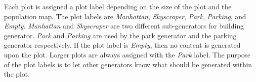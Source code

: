 Each plot is assigned a plot label depending on the size of the plot and the population map.
The plot labels are \textit{Manhattan}, \textit{Skyscraper}, \textit{Park}, \textit{Parking}, and \textit{Empty}.
\textit{Manhattan} and \textit{Skyscraper} are two different sub-generators for building generator. 
\textit{Park} and \textit{Parking} are used by the park generator and the parking generator respectively.
If the plot label is \textit{Empty}, then no content is generated upon the plot.
Larger plots are always assigned with the \textit{Park} label.
The purpose of the plot labels is to let other generators know what should be generated within the plot.